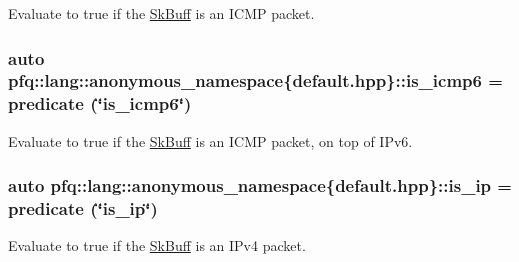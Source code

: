 Evaluate to {\ttfamily true} if the \hyperlink{structpfq_1_1lang_1_1SkBuff}{Sk\+Buff} is an I\+C\+MP packet. 

\subsubsection[{\texorpdfstring{is\+\_\+icmp6}{is_icmp6}}]{\setlength{\rightskip}{0pt plus 5cm}auto pfq\+::lang\+::anonymous\+\_\+namespace\{default.\+hpp\}\+::is\+\_\+icmp6 = {\bf predicate} (\char`\"{}is\+\_\+icmp6\char`\"{})}\hypertarget{namespacepfq_1_1lang_1_1anonymous__namespace_02default_8hpp_03_a01d6e9764945cc33a11f3ce6a9925549}{}\label{namespacepfq_1_1lang_1_1anonymous__namespace_02default_8hpp_03_a01d6e9764945cc33a11f3ce6a9925549}


Evaluate to {\ttfamily true} if the \hyperlink{structpfq_1_1lang_1_1SkBuff}{Sk\+Buff} is an I\+C\+MP packet, on top of I\+Pv6. 

\subsubsection[{\texorpdfstring{is\+\_\+ip}{is_ip}}]{\setlength{\rightskip}{0pt plus 5cm}auto pfq\+::lang\+::anonymous\+\_\+namespace\{default.\+hpp\}\+::is\+\_\+ip = {\bf predicate} (\char`\"{}is\+\_\+ip\char`\"{})}\hypertarget{namespacepfq_1_1lang_1_1anonymous__namespace_02default_8hpp_03_aa97a34e12e4c6bc2d85a5c169800cfa4}{}\label{namespacepfq_1_1lang_1_1anonymous__namespace_02default_8hpp_03_aa97a34e12e4c6bc2d85a5c169800cfa4}


Evaluate to {\ttfamily true} if the \hyperlink{structpfq_1_1lang_1_1SkBuff}{Sk\+Buff} is an I\+Pv4 packet. 

